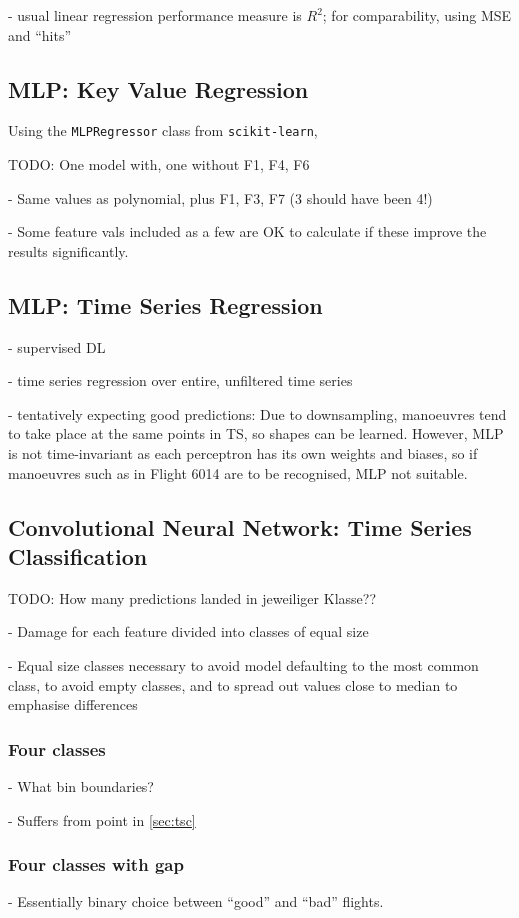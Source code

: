 - usual linear regression performance measure is \(R^2\); for comparability, using MSE and ``hits''

\subsection{MLP: Key Value Regression}
Using the \texttt{MLPRegressor} class from \texttt{scikit-learn},

TODO: One model with, one without F1, F4, F6

- Same values as polynomial, plus F1, F3, F7 (3 should have been 4!)

- Some feature vals included as a few are OK to calculate if these improve the results significantly.

\subsection{MLP: Time Series Regression}
- supervised DL

- time series regression over entire, unfiltered time series

- tentatively expecting good predictions: Due to downsampling, manoeuvres tend to take place at the same points in TS, so shapes can be learned. However, MLP is not time-invariant as each perceptron has its own weights and biases, so if manoeuvres such as in Flight 6014 are to be recognised, MLP not suitable.

\subsection{Convolutional Neural Network: Time Series Classification}

TODO: How many predictions landed in jeweiliger Klasse??

- Damage for each feature divided into classes of equal size

- Equal size classes necessary to avoid model defaulting to the most common class, to avoid empty classes, and to spread out values close to median to emphasise differences

\subsubsection{Four classes}
- What bin boundaries?

- Suffers from point in \ref{sec:tsc}

\subsubsection{Four classes with gap}
- Essentially binary choice between ``good'' and ``bad'' flights.

